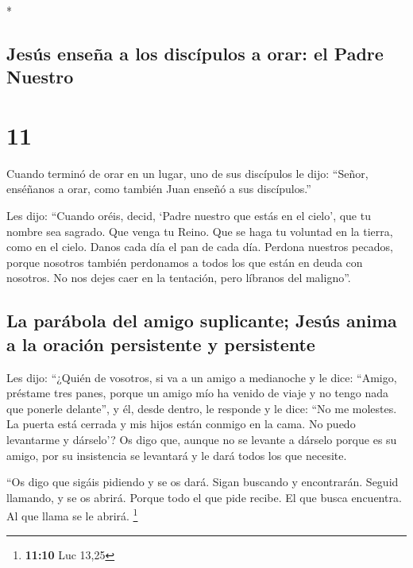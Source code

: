 \begin{paracol}{2}
\begin{otherlanguage}{english}
\end{otherlanguage}

\switchcolumn[0]*

\hypertarget{jesuxfas-enseuxf1a-a-los-discuxedpulos-a-orar-el-padre-nuestro}{%
\subsection{Jesús enseña a los discípulos a orar: el Padre
Nuestro}\label{jesuxfas-enseuxf1a-a-los-discuxedpulos-a-orar-el-padre-nuestro}}

\hypertarget{section-20}{%
\section{11}\label{section-20}}

 Cuando terminó de orar en un lugar, uno de sus discípulos
le dijo: ``Señor, enséñanos a orar, como también Juan enseñó a sus
discípulos.''

 Les dijo: ``Cuando oréis, decid, `Padre nuestro que estás
en el cielo', que tu nombre sea sagrado. Que venga tu Reino. Que se haga
tu voluntad en la tierra, como en el cielo.  Danos cada
día el pan de cada día.  Perdona nuestros pecados, porque
nosotros también perdonamos a todos los que están en deuda con nosotros.
No nos dejes caer en la tentación, pero líbranos del maligno''.

\hypertarget{la-paruxe1bola-del-amigo-suplicante-jesuxfas-anima-a-la-oraciuxf3n-persistente-y-persistente}{%
\subsection{La parábola del amigo suplicante; Jesús anima a la oración
persistente y
persistente}\label{la-paruxe1bola-del-amigo-suplicante-jesuxfas-anima-a-la-oraciuxf3n-persistente-y-persistente}}

 Les dijo: ``¿Quién de vosotros, si va a un amigo a
medianoche y le dice: ``Amigo, préstame tres panes, 
porque un amigo mío ha venido de viaje y no tengo nada que ponerle
delante'',  y él, desde dentro, le responde y le dice:
``No me molestes. La puerta está cerrada y mis hijos están conmigo en la
cama. No puedo levantarme y dárselo'?  Os digo que, aunque
no se levante a dárselo porque es su amigo, por su insistencia se
levantará y le dará todos los que necesite.

 ``Os digo que sigáis pidiendo y se os dará. Sigan
buscando y encontrarán. Seguid llamando, y se os abrirá. 
Porque todo el que pide recibe. El que busca encuentra. Al que llama se
le abrirá. \footnote{\textbf{11:10} Luc 13,25}


\end{paracol}
